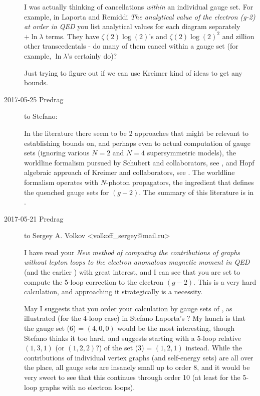 \begin{description}
I was actually thinking of cancellations \emph{within} an individual
gauge set.  For example, in
Laporta and Remiddi
{\em The analytical value of the electron (g-2) at order in QED}
you list analytical values for each diagram separately $+\ln\lambda$
terms. They have $\zeta(2)\log(2)$'s and $\zeta(2)\log(2)^2$ and zillion
other transcedentals - do many of them cancel within a gauge set (for
example, $\ln\lambda$'s certainly do)?

Just trying to figure out if we can use Kreimer kind of ideas to get any
bounds.

\item[2017-05-25 Predrag] to Stefano:

In the literature there seem to be 2 approaches that might be relevant to
establishing bounds on, and perhaps even to actual computation of
gauge sets
(ignoring various $N=2$ and $N=4$ supersymmetric models),
the worldline formalism pursued by Schubert and
collaborators, see ,
and Hopf algebraic approach of Kreimer and
collaborators, see .
The worldline formalism operates with $N$-photon propagators, the ingredient
that defines the quenched gauge sets for $(g-2)$. The summary
of this literature is in .

\item[2017-05-21 Predrag] to
Sergey  A. Volkov <volkoff\_sergey@mail.ru>
%

I have read your
{\em New method of computing the contributions of graphs without lepton
loops to the electron anomalous magnetic moment in {QED}}
(and the earlier ) with great interest, and I can see
that you are set to compute the 5-loop correction to the electron
$(g-2)$. This is a very hard calculation, and approaching it
strategically is a necessity.

May I suggests that you order your calculation by gauge sets of
, as illustrated (for the 4-loop case) in Stefano
Laporta's ? My hunch is that the gauge
set (6) = $(4,0,0)$ would be the most interesting, though Stefano thinks
it too hard, and suggests starting with a 5-loop relative $(1,3,1)$ (or
$(1,2,2)$?) of the set (3) = $(1,2,1)$ instead. While the contributions
of individual vertex graphs (and self-energy sets) are all
over the place, all gauge sets are insanely small up to order
8, and it would be very sweet to see that this continues through order 10
(at least for the 5-loop graphs with no electron loops).


\end{description}
